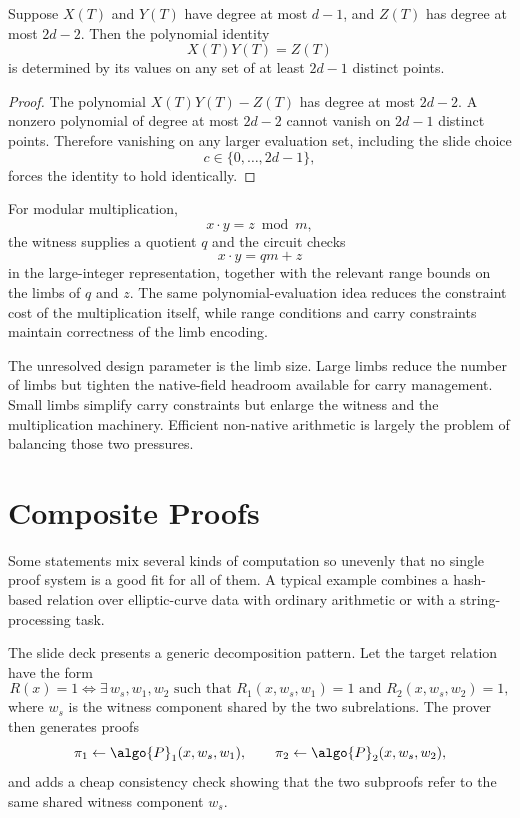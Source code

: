 \documentclass[11pt]{article}
\begin{document}
\begin{proposition}
Suppose $X(T)$ and $Y(T)$ have degree at most $d-1$, and $Z(T)$ has degree at
most $2d-2$.  Then the polynomial identity
\[
  X(T)Y(T)=Z(T)
\]
is determined by its values on any set of at least $2d-1$ distinct points.
\end{proposition}

\begin{proof}
The polynomial $X(T)Y(T)-Z(T)$ has degree at most $2d-2$.  A nonzero polynomial
of degree at most $2d-2$ cannot vanish on $2d-1$ distinct points.  Therefore
vanishing on any larger evaluation set, including the slide choice
\[
  c \in \{0,\ldots,2d-1\},
\]
forces the identity to hold identically.
\end{proof}

For modular multiplication,
\[
  x \cdot y = z \bmod m,
\]
the witness supplies a quotient $q$ and the circuit checks
\[
  x \cdot y = q m + z
\]
in the large-integer representation, together with the relevant range bounds on
the limbs of $q$ and $z$.  The same polynomial-evaluation idea reduces the
constraint cost of the multiplication itself, while range conditions and carry
constraints maintain correctness of the limb encoding.

The unresolved design parameter is the limb size.  Large limbs reduce the
number of limbs but tighten the native-field headroom available for carry
management.  Small limbs simplify carry constraints but enlarge the witness and
the multiplication machinery.  Efficient non-native arithmetic is largely the
problem of balancing those two pressures.

\section{Composite Proofs}

Some statements mix several kinds of computation so unevenly that no single
proof system is a good fit for all of them.  A typical example combines a
hash-based relation over elliptic-curve data with ordinary arithmetic or with a
string-processing task.

The slide deck presents a generic decomposition pattern.  Let the target
relation have the form
\[
  R(x)=1
  \iff
  \exists\, w_s,w_1,w_2
  \text{ such that }
  R_1(x,w_s,w_1)=1
  \text{ and }
  R_2(x,w_s,w_2)=1,
\]
where $w_s$ is the witness component shared by the two subrelations.  The
prover then generates proofs
\[
  \pi_1 \leftarrow \algo{P}_1(x,w_s,w_1),
  \qquad
  \pi_2 \leftarrow \algo{P}_2(x,w_s,w_2),
\]
and adds a cheap consistency check showing that the two subproofs refer to the
same shared witness component $w_s$.
\end{document}

